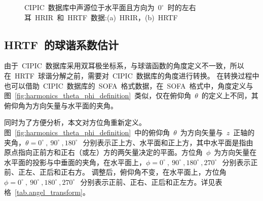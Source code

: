\begin{figure}[H]
\centering
{}
\hfill
{}
\caption{CIPIC~数据库中声源位于水平面且方向为~$0^{\circ}$~时的左右耳~HRIR~和~HRTF~数据:(a)~HRIR，(b)~HRTF}
\label{fig:CIPIC_0du}
\end{figure}



\subsection{HRTF~的球谐系数估计}\label{subsec.HRTF_coe}


由于~CIPIC~数据库采用双耳极坐标系，与球谐函数的角度定义不一致，所以在~HRTF~球谐分解之前，需要对~CIPIC~数据库的角度进行转换。
在转换过程中也可以借助~CIPIC~数据库的~SOFA~格式数据，在~SOFA~格式中，角度定义与图~\ref{fig:harmonics_theta_phi_definition}~类似，仅在俯仰角~$\theta$~的定义上不同，其俯仰角为方向矢量与水平面的夹角。

同时为了方便分析，本文对方位角重新定义。 图~\ref{fig:harmonics_theta_phi_definition}~中的俯仰角~$\theta$~为方向矢量与~$z$~正轴的夹角，$\theta=0^{\circ}~,~90^{\circ}~,180^{\circ}~$~分别表示正上方、水平面和正上方，其中水平面是指由原点指向正前方和正右（或左）方的两矢量决定的平面。方位角~$\phi$~为方向矢量在水平面的投影与中垂面的夹角，在水平面上，$\phi=0^ {\circ}~,~90^{\circ}~,180^{\circ}~,270^{\circ}~$~分别表示正前、正左、正后和正右方。
调整后，俯仰角不变，在水平面上，方位角~$\phi=0^{\circ}~,~90^{\circ}~,180^{\circ}~,270^{\circ}~$~分别表示正前、正右、正后和正左方。详见表格~\ref{tab.angel_transform}。

